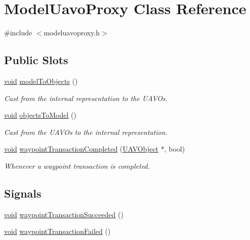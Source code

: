 \hypertarget{class_model_uavo_proxy}{\section{\-Model\-Uavo\-Proxy \-Class \-Reference}
\label{class_model_uavo_proxy}
}


{\ttfamily \#include $<$modeluavoproxy.\-h$>$}

\subsection*{\-Public \-Slots}
\begin{DoxyCompactItemize}
\item 
\hyperlink{group___u_a_v_objects_plugin_ga444cf2ff3f0ecbe028adce838d373f5c}{void} \hyperlink{group___o_p_map_plugin_ga3fdf6b22d36aa34b0eb480ab41cf696e}{model\-To\-Objects} ()
\begin{DoxyCompactList}\small\item\em \-Cast from the internal representation to the \-U\-A\-V\-Os. \end{DoxyCompactList}\item 
\hyperlink{group___u_a_v_objects_plugin_ga444cf2ff3f0ecbe028adce838d373f5c}{void} \hyperlink{group___o_p_map_plugin_gadf2e7f7ca1a0ae5d380c107e7dbf9132}{objects\-To\-Model} ()
\begin{DoxyCompactList}\small\item\em \-Cast from the \-U\-A\-V\-Os to the internal representation. \end{DoxyCompactList}\item 
\hyperlink{group___u_a_v_objects_plugin_ga444cf2ff3f0ecbe028adce838d373f5c}{void} \hyperlink{group___o_p_map_plugin_ga428d73f0e25b47749d707e5c6bd5d34f}{waypoint\-Transaction\-Completed} (\hyperlink{class_u_a_v_object}{\-U\-A\-V\-Object} $\ast$, bool)
\begin{DoxyCompactList}\small\item\em \-Whenever a waypoint transaction is completed. \end{DoxyCompactList}\end{DoxyCompactItemize}
\subsection*{\-Signals}
\begin{DoxyCompactItemize}
\item 
\hyperlink{group___u_a_v_objects_plugin_ga444cf2ff3f0ecbe028adce838d373f5c}{void} \hyperlink{group___o_p_map_plugin_gaf5825b310723b58fb271811c478954ec}{waypoint\-Transaction\-Succeeded} ()
\item 
\hyperlink{group___u_a_v_objects_plugin_ga444cf2ff3f0ecbe028adce838d373f5c}{void} \hyperlink{group___o_p_map_plugin_gafd0e6a7bd5963a1363aace5cbdaac47f}{waypoint\-Transaction\-Failed} ()
\end{DoxyCompactItemize}
